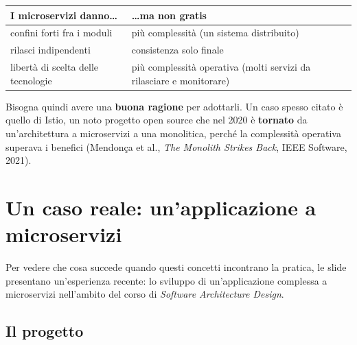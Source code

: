 \begin{center}
\renewcommand{\arraystretch}{1.4}
\begin{tabular}{@{}>{\raggedright\arraybackslash}p{6.6cm} >{\raggedright\arraybackslash}p{6.6cm}@{}}
  \toprule
  \textcolor{swgreen}{\textbf{I microservizi danno\ldots}} & \textcolor{swred}{\textbf{\ldots ma non gratis}} \\
  \midrule
  confini forti fra i moduli & più complessità (un sistema distribuito) \\
  rilasci indipendenti & consistenza solo finale \\
  libertà di scelta delle tecnologie & più complessità operativa (molti servizi da rilasciare e monitorare) \\
  \bottomrule
\end{tabular}
\end{center}

Bisogna quindi avere una \textbf{buona ragione} per adottarli. Un caso spesso citato è quello di Istio, un noto progetto
open source che nel 2020 è \textbf{tornato} da un'architettura a microservizi a una monolitica, perché la complessità
operativa superava i benefici (Mendonça et al., \textit{The Monolith Strikes Back}, IEEE Software, 2021).

\section{Un caso reale: un'applicazione a microservizi}

Per vedere che cosa succede quando questi concetti incontrano la pratica, le slide presentano un'esperienza recente: lo
sviluppo di un'applicazione complessa a microservizi nell'ambito del corso di \textit{Software Architecture Design}.

\subsection{Il progetto}

